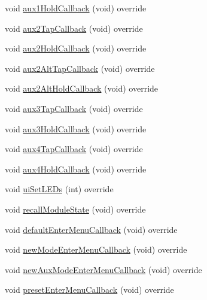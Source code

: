 \begin{DoxyCompactItemize}
void \mbox{\hyperlink{class_via_sync_1_1_via_sync_u_i_aaa66c2014e79270140575713998d67ae}{aux1\+Hold\+Callback}} (void) override
\item 
void \mbox{\hyperlink{class_via_sync_1_1_via_sync_u_i_a117e57feaf74b2619c1506aacc421721}{aux2\+Tap\+Callback}} (void) override
\item 
void \mbox{\hyperlink{class_via_sync_1_1_via_sync_u_i_af692a47db686fac2e929549217452258}{aux2\+Hold\+Callback}} (void) override
\item 
void \mbox{\hyperlink{class_via_sync_1_1_via_sync_u_i_ad837068e55fb66fe3fe2aa15ff90ec21}{aux2\+Alt\+Tap\+Callback}} (void) override
\item 
void \mbox{\hyperlink{class_via_sync_1_1_via_sync_u_i_af6b69d61a650e68e37286490191634ed}{aux2\+Alt\+Hold\+Callback}} (void) override
\item 
void \mbox{\hyperlink{class_via_sync_1_1_via_sync_u_i_afe95d77f17525a7e612485089a01ab0d}{aux3\+Tap\+Callback}} (void) override
\item 
void \mbox{\hyperlink{class_via_sync_1_1_via_sync_u_i_ae35a16d1e3a6158ffd306b06e93b16a4}{aux3\+Hold\+Callback}} (void) override
\item 
void \mbox{\hyperlink{class_via_sync_1_1_via_sync_u_i_a1cf7ef02457d9f7887da0721799aadc0}{aux4\+Tap\+Callback}} (void) override
\item 
void \mbox{\hyperlink{class_via_sync_1_1_via_sync_u_i_a15f48c7e1d5f77292ee46d997421cd4e}{aux4\+Hold\+Callback}} (void) override
\item 
void \mbox{\hyperlink{class_via_sync_1_1_via_sync_u_i_a694877fa6ee36aa11d9fbf3e249f95e5}{ui\+Set\+L\+E\+Ds}} (int) override
\item 
void \mbox{\hyperlink{class_via_sync_1_1_via_sync_u_i_a1a59cd903a2e11b698445b02c9fe5a48}{recall\+Module\+State}} (void) override
\item 
void \mbox{\hyperlink{class_via_sync_1_1_via_sync_u_i_a53dbd5157906ae81c3d54a56eafbf06e}{default\+Enter\+Menu\+Callback}} (void) override
\item 
void \mbox{\hyperlink{class_via_sync_1_1_via_sync_u_i_a553b539840029324ea43feb128f4b2c9}{new\+Mode\+Enter\+Menu\+Callback}} (void) override
\item 
void \mbox{\hyperlink{class_via_sync_1_1_via_sync_u_i_a842b231f8014209b4e96b3b8c06b16e1}{new\+Aux\+Mode\+Enter\+Menu\+Callback}} (void) override
\item 
void \mbox{\hyperlink{class_via_sync_1_1_via_sync_u_i_a390deaa64d96fa447720294817149dde}{preset\+Enter\+Menu\+Callback}} (void) override

\end{DoxyCompactItemize}
